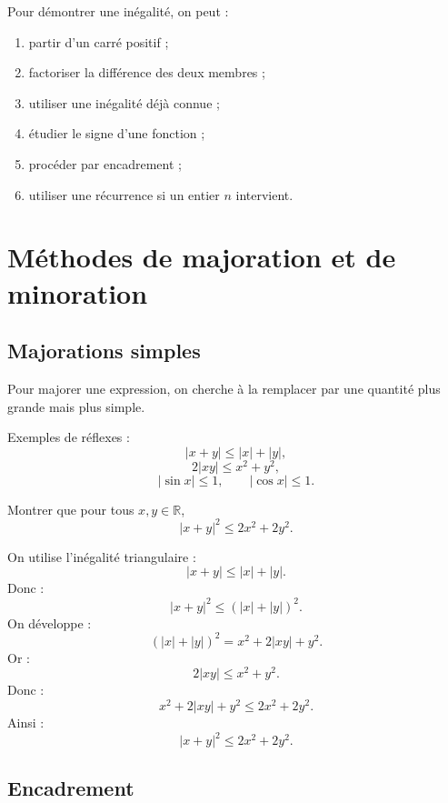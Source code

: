 \documentclass[11pt,a4paper]{article}
\newcommand{\R}{\mathbb R}
\newcommand{\abs}[1]{\left|#1\right|}
\begin{document}
\begin{methodbox}
Pour démontrer une inégalité, on peut :
\begin{enumerate}
    \item partir d'un carré positif ;
    \item factoriser la différence des deux membres ;
    \item utiliser une inégalité déjà connue ;
    \item étudier le signe d'une fonction ;
    \item procéder par encadrement ;
    \item utiliser une récurrence si un entier \(n\) intervient.
\end{enumerate}
\end{methodbox}

\section{Méthodes de majoration et de minoration}

\subsection{Majorations simples}

\begin{methodbox}
Pour majorer une expression, on cherche à la remplacer par une quantité plus grande mais plus simple.

Exemples de réflexes :
\[
\abs{x+y}\leq \abs{x}+\abs{y},
\]
\[
2\abs{xy}\leq x^2+y^2,
\]
\[
\abs{\sin x}\leq1,
\qquad
\abs{\cos x}\leq1.
\]
\end{methodbox}

\begin{exercicebox}[Majoration]
Montrer que pour tous \(x,y\in\R\),
\[
\abs{x+y}^2\leq2x^2+2y^2.
\]
\end{exercicebox}

\begin{correctionbox}
On utilise l'inégalité triangulaire :
\[
\abs{x+y}\leq\abs{x}+\abs{y}.
\]
Donc :
\[
\abs{x+y}^2\leq(\abs{x}+\abs{y})^2.
\]
On développe :
\[
(\abs{x}+\abs{y})^2=x^2+2\abs{xy}+y^2.
\]
Or :
\[
2\abs{xy}\leq x^2+y^2.
\]
Donc :
\[
x^2+2\abs{xy}+y^2\leq2x^2+2y^2.
\]
Ainsi :
\[
\abs{x+y}^2\leq2x^2+2y^2.
\]
\end{correctionbox}

\subsection{Encadrement}
\end{document}
